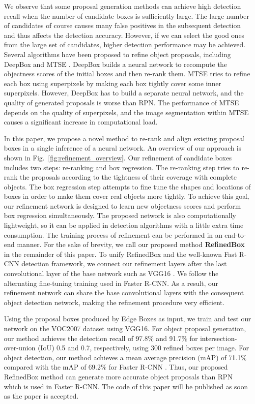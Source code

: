 \documentclass[letterpaper]{article} %
\newcommand{\figref}[1]{Fig.~\ref{#1}}
\begin{document}
We observe that some proposal generation methods can achieve high detection
recall when the number of candidate boxes is sufficiently large.
The large number of candidates of course causes many false positives in
the subsequent detection and thus affects the detection accuracy.
%
However, if we can select the good ones from the large set of candidates,
higher detection performance may be achieved.
%
Several algorithms have been proposed to refine object proposals,
including DeepBox \cite{kuo2015deepbox} and MTSE \cite{chen2015improving}.
DeepBox builds a neural network to recompute the objectness scores of the
initial boxes and then re-rank them.
MTSE tries to refine each box using superpixels by making each box tightly
cover some inner superpixels.
However, DeepBox has to build a separate neural network, and the quality of
generated proposals is worse than RPN.
The performance of MTSE depends on the quality of superpixels,
and the image segmentation within MTSE causes a significant increase in
computational load.


In this paper, we propose a novel method to re-rank and align existing proposal
boxes in a single inference of a neural network.
An overview of our approach is shown in \figref{fig:refinement_overview}.
Our refinement of candidate boxes includes two steps: re-ranking and box regression.
The re-ranking step tries to re-rank the proposals according to the
tightness of their coverage with complete objects.
The box regression step attempts to fine tune the shapes and locations of boxes
in order to make them cover real objects more tightly.
%
To achieve this goal, our refinement network is designed to learn new objectness
scores and perform box regression simultaneously.
The proposed network is also computationally lightweight,
so it can be applied in detection algorithms with a little extra time consumption.
The training process of refinement can be performed in an end-to-end manner.
%
For the sake of brevity, we call our proposed method \textbf{RefinedBox} in the
remainder of this paper.
%
To unify RefinedBox and the well-known Fast R-CNN \cite{girshick2015fast}
detection framework, we connect our refinement layers after the last convolutional
layer of the base network such as VGG16 \cite{simonyan2014very}.
We follow the alternating fine-tuning training used in Faster R-CNN.
As a result, our refinement network can share the base convolutional layers with
the consequent object detection network, making the refinement procedure very efficient.


Using the proposal boxes produced by Edge Boxes \cite{zitnick2014edge} as input,
we train and test our network on the VOC2007 dataset \cite{pascal-voc-2007} using VGG16.
For object proposal generation, our method achieves the detection recall of
97.8\% and 91.7\% for intersection-over-union (IoU) 0.5 and 0.7,
respectively, using 300 refined boxes per image.
For object detection, our method achieves a mean average precision (mAP) of
71.1\% compared with the mAP of 69.2\% for Faster R-CNN \cite{ren2015faster}.
Thus, our proposed RefinedBox method can generate more accurate object proposals
than RPN which is used in Faster R-CNN.
The code of this paper will be published as soon as the paper is accepted.
\end{document}
